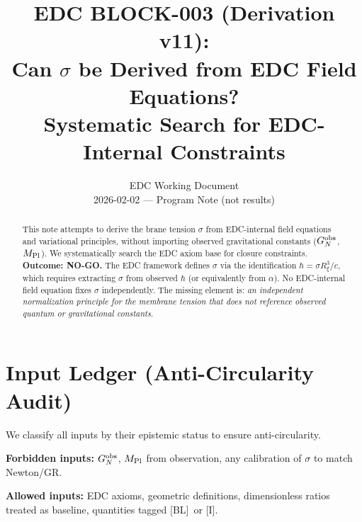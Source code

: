\documentclass[11pt,a4paper]{article}
\title{\textbf{EDC BLOCK-003 (Derivation v11):}\\[0.3em]
Can $\sigma$ be Derived from EDC Field Equations?\\[0.3em]
\large Systematic Search for EDC-Internal Constraints}
\author{EDC Working Document\\[0.5em]
\small 2026-02-02 --- Program Note (not results)}
\date{}
\newcommand{\BL}{\textsc{[BL]}}
\newcommand{\Ident}{\textsc{[I]}}
\begin{document}
\maketitle

\begin{abstract}
This note attempts to derive the brane tension $\sigma$ from EDC-internal field
equations and variational principles, without importing observed gravitational
constants ($G_N^{\rm obs}$, $M_{\rm Pl}$). We systematically search the EDC
axiom base for closure constraints.
\textbf{Outcome: NO-GO.} The EDC framework defines $\sigma$ via the identification
$\hbar = \sigma R_\xi^3/c$, which requires extracting $\sigma$ from observed
$\hbar$ (or equivalently from $\alpha$). No EDC-internal field equation fixes
$\sigma$ independently. The missing element is: \textit{an independent
normalization principle for the membrane tension that does not reference
observed quantum or gravitational constants}.
\end{abstract}

\tableofcontents
\newpage

\section{Input Ledger (Anti-Circularity Audit)}

We classify all inputs by their epistemic status to ensure anti-circularity.

\begin{inputbox}
\textbf{Forbidden inputs:} $G_N^{\rm obs}$, $M_{\rm Pl}$ from observation,
any calibration of $\sigma$ to match Newton/GR.

\textbf{Allowed inputs:} EDC axioms, geometric definitions, dimensionless
ratios treated as baseline, quantities tagged \BL\ or \Ident.
\end{inputbox}
\end{document}
